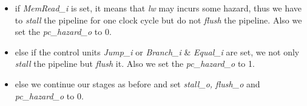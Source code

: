 \documentclass{article}
\begin{document}
\begin{itemize}
\begin{itemize}
            \item if \textit{MemRead\_i} is set, it means that \textit{lw} may incurs some hazard, thus we have to \textit{stall} the pipeline for one clock cycle but do not \textit{flush} the pipeline. 
                  Also we set the \textit{pc\_hazard\_o} to 0.  
            \item else if the control units \textit{Jump\_i} or \textit{Branch\_i} \& \textit{Equal\_i} are set, we not only \textit{stall} the pipeline but \textit{flush} it.
                  Also we set the \textit{pc\_hazard\_o} to 1.
            \item else we continue our stages as before and set \textit{stall\_o, flush\_o} and \textit{pc\_hazard\_o} to 0.
        \end{itemize}
    \end{itemize}

    \newpage
\end{document}
